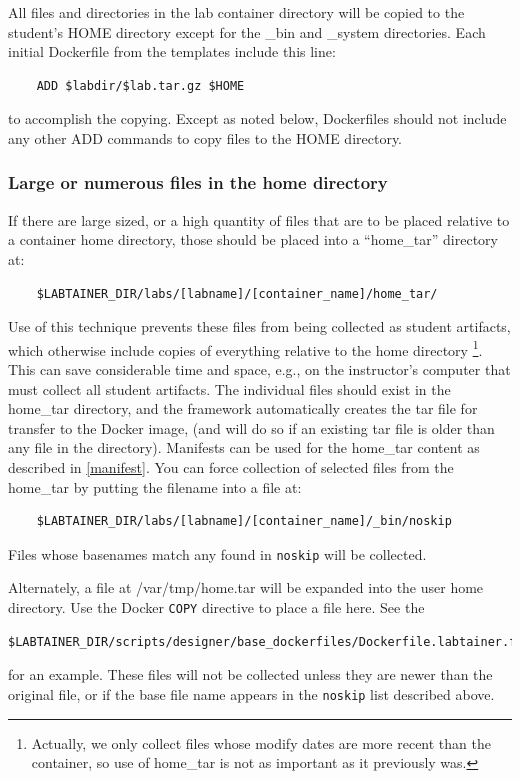 \documentclass[12pt]{article}
\begin{document}
All files and directories in the lab container directory will be copied to the student's HOME
directory except for the \_bin and \_system directories.
Each initial Dockerfile from the templates include this line:
\begin{verbatim}
    ADD $labdir/$lab.tar.gz $HOME
\end{verbatim}
to accomplish the copying. Except as noted below, Dockerfiles should not include any other ADD commands
to copy files to the HOME directory.
\subsubsection{Large or numerous files in the home directory} \label{large files}
If there are large sized, or a high quantity of files that are to be placed relative to a 
container home directory, those should be placed into a ``home\_tar'' directory at:
\begin{verbatim}
    $LABTAINER_DIR/labs/[labname]/[container_name]/home_tar/
\end{verbatim}
\noindent Use of this technique prevents these files from being collected as student artifacts, which
otherwise include copies of everything relative to the home directory \footnote{Actually, we only collect
files whose modify dates are more recent than the container, so use of home\_tar is not as
important as it previously was.}.  This
can save considerable time and space, e.g., on the instructor's computer that must collect
all student artifacts.
The individual files should exist in the home\_tar directory, and the framework automatically
creates the tar file for transfer to the Docker image, (and will do so if an existing tar file
is older than any file in the directory).  Manifests can be used for the home\_tar content
as described in \ref{manifest}.  You can force collection of selected files from the home\_tar
by putting the filename into a file at:
\begin{verbatim}
    $LABTAINER_DIR/labs/[labname]/[container_name]/_bin/noskip
\end{verbatim}
\noindent  Files whose basenames match any found in {\tt noskip} will be collected.

Alternately, a file at /var/tmp/home.tar will be expanded into the user home directory.
Use the Docker {\tt COPY} directive to place a file here.  See the 
\begin{verbatim}
$LABTAINER_DIR/scripts/designer/base_dockerfiles/Dockerfile.labtainer.firefox
\end{verbatim}
for an example.  These files will not be collected unless they are newer than the original file,
or if the base file name appears in the {\tt noskip} list described above.
\end{document}
